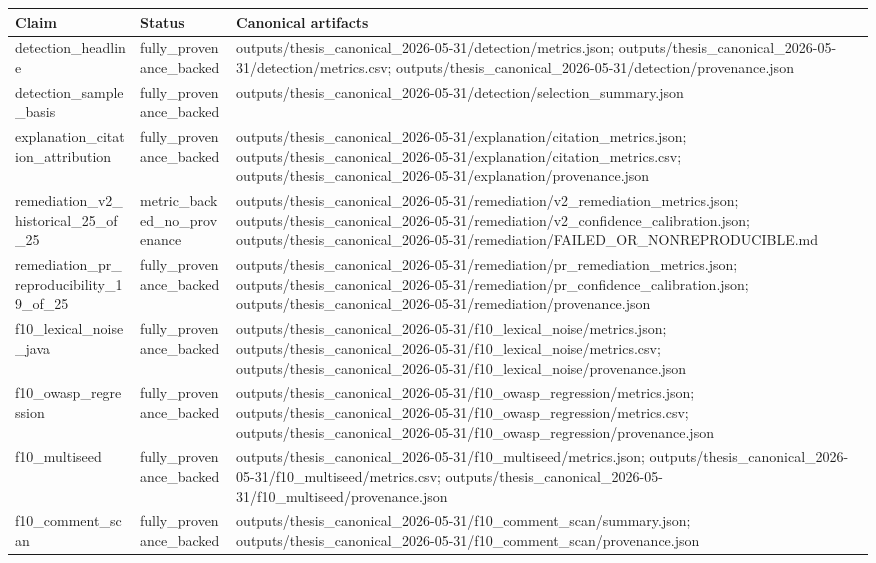 \begin{tabular}{lll}
\hline
Claim & Status & Canonical artifacts \\
\hline
detection\_headline & fully\_provenance\_backed & outputs/thesis\_canonical\_2026-05-31/detection/metrics.json; outputs/thesis\_canonical\_2026-05-31/detection/metrics.csv; outputs/thesis\_canonical\_2026-05-31/detection/provenance.json \\
detection\_sample\_basis & fully\_provenance\_backed & outputs/thesis\_canonical\_2026-05-31/detection/selection\_summary.json \\
explanation\_citation\_attribution & fully\_provenance\_backed & outputs/thesis\_canonical\_2026-05-31/explanation/citation\_metrics.json; outputs/thesis\_canonical\_2026-05-31/explanation/citation\_metrics.csv; outputs/thesis\_canonical\_2026-05-31/explanation/provenance.json \\
remediation\_v2\_historical\_25\_of\_25 & metric\_backed\_no\_provenance & outputs/thesis\_canonical\_2026-05-31/remediation/v2\_remediation\_metrics.json; outputs/thesis\_canonical\_2026-05-31/remediation/v2\_confidence\_calibration.json; outputs/thesis\_canonical\_2026-05-31/remediation/FAILED\_OR\_NONREPRODUCIBLE.md \\
remediation\_pr\_reproducibility\_19\_of\_25 & fully\_provenance\_backed & outputs/thesis\_canonical\_2026-05-31/remediation/pr\_remediation\_metrics.json; outputs/thesis\_canonical\_2026-05-31/remediation/pr\_confidence\_calibration.json; outputs/thesis\_canonical\_2026-05-31/remediation/provenance.json \\
f10\_lexical\_noise\_java & fully\_provenance\_backed & outputs/thesis\_canonical\_2026-05-31/f10\_lexical\_noise/metrics.json; outputs/thesis\_canonical\_2026-05-31/f10\_lexical\_noise/metrics.csv; outputs/thesis\_canonical\_2026-05-31/f10\_lexical\_noise/provenance.json \\
f10\_owasp\_regression & fully\_provenance\_backed & outputs/thesis\_canonical\_2026-05-31/f10\_owasp\_regression/metrics.json; outputs/thesis\_canonical\_2026-05-31/f10\_owasp\_regression/metrics.csv; outputs/thesis\_canonical\_2026-05-31/f10\_owasp\_regression/provenance.json \\
f10\_multiseed & fully\_provenance\_backed & outputs/thesis\_canonical\_2026-05-31/f10\_multiseed/metrics.json; outputs/thesis\_canonical\_2026-05-31/f10\_multiseed/metrics.csv; outputs/thesis\_canonical\_2026-05-31/f10\_multiseed/provenance.json \\
f10\_comment\_scan & fully\_provenance\_backed & outputs/thesis\_canonical\_2026-05-31/f10\_comment\_scan/summary.json; outputs/thesis\_canonical\_2026-05-31/f10\_comment\_scan/provenance.json \\

\end{tabular}
